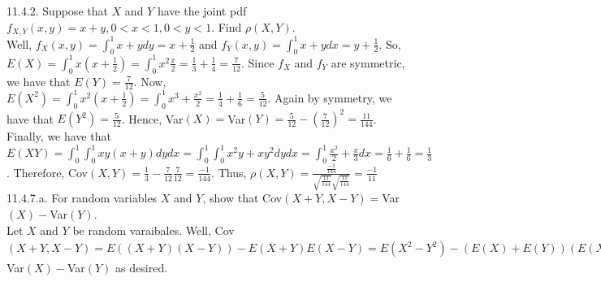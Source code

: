 \documentclass[12pt]{article}
\begin{document}
11.4.2. Suppose that $X$ and $Y$ have the joint pdf $f_{X,Y}(x,y)=x+y, 0<x<1, 0<y<1$. Find $\rho(X,Y)$.\\
Well, $f_X(x,y)=\int_0^1x+y dy=x+\frac12$ and $f_Y(x,y)=\int_0^1x+y dx=y+\frac12$. So, $E(X)=\int_0^1x(x+\frac12)=\int_0^1x^2\frac{x}{2}=\frac13+\frac14=\frac{7}{12}$. Since $f_X$ and $f_Y$ are symmetric, we have that $E(Y)=\frac{7}{12}$. Now, $E(X^2)=\int_0^1x^2(x+\frac12)=\int_0^1x^3+\frac{x^2}{2}=\frac14+\frac16=\frac{5}{12}$. Again by symmetry, we have that $E(Y^2)=\frac{5}{12}$. Hence, Var$(X)=$Var$(Y)=\frac{5}{12}-(\frac{7}{12})^2=\frac{11}{144}$. Finally, we have that $E(XY)=\int_0^1\int_0^1xy(x+y) dydx=\int_0^1\int_0^1x^2y+xy^2 dydx=\int_0^1\frac{x^2}{2}+\frac{x}{3}dx=\frac16+\frac16=\frac13$. Therefore, Cov$(X,Y)=\frac13-\frac{7}{12}\frac{7}{12}=\frac{-1}{144}$. Thus, $\rho(X,Y)=\frac{\frac{-1}{144}}{\sqrt{\frac{11}{144}}\sqrt{\frac{11}{144}}}=\frac{-1}{11}$\\[20pt]

11.4.7.a. For random variables $X$ and $Y$, show that Cov$(X+Y, X-Y)=$Var$(X)-$Var$(Y)$.\\
Let $X$ and $Y$ be random varaibales. Well, Cov$(X+Y, X-Y)=E((X+Y)(X-Y))-E(X+Y)E(X-Y)=E(X^2-Y^2)-(E(X)+E(Y))(E(X)-E(Y))=E(X^2)-E(Y^2)-((E(X))^2-(E(Y))^2)=E(X^2)-(E(X))^2-E(Y^2)+(E(Y))^2=$Var$(X)-$Var$(Y)$ as desired.
\end{document}
